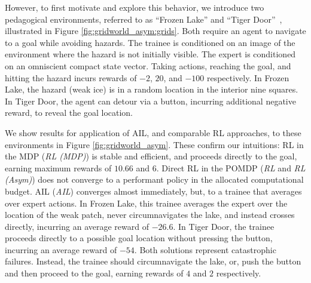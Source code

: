 

However, to first motivate and explore this behavior, we introduce two pedagogical environments, referred to as ``Frozen Lake'' and ``Tiger Door''~\citep{littman1995pomdp,Spaan2012}, illustrated in Figure \ref{fig:gridworld_asym:grids}. Both require an agent to navigate to a goal while avoiding hazards.  The trainee is conditioned on an image of the environment where the hazard is not initially visible. The expert is conditioned on an omniscient compact state vector.  Taking actions, reaching the goal, and hitting the hazard incurs rewards of $-2$, $20$, and $-100$ respectively.  In Frozen Lake, the hazard (weak ice) is in a random location in the interior nine squares.  In Tiger Door, the agent can detour via a button, incurring additional negative reward, to reveal the goal location.

We show results for application of AIL, and comparable RL approaches, to these environments in Figure \ref{fig:gridworld_asym}.  These confirm our intuitions:   RL in the MDP (\emph{RL (MDP)}) is stable and efficient, and proceeds directly to the goal, earning maximum rewards of $10.66$ and $6$.  Direct RL in the POMDP (\emph{RL} and \emph{RL (Asym)}) does not converge to a performant policy in the allocated computational budget.  AIL (\emph{AIL}) converges almost immediately, but, to a trainee that averages over expert actions.  In Frozen Lake, this trainee averages the expert over the location of the weak patch, never circumnavigates the lake, and instead crosses directly, incurring an average reward of $-26.6$.  In Tiger Door, the trainee proceeds directly to a possible goal location without pressing the button, incurring an average reward of $-54$.  Both solutions represent catastrophic failures.  Instead, the trainee should circumnavigate the lake, or, push the button and then proceed to the goal, earning rewards of $4$ and $2$ respectively. 

